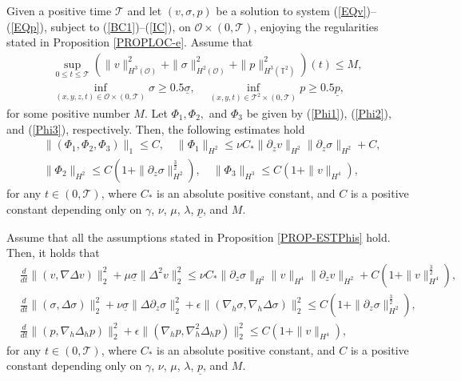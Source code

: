 \documentclass[10pt,a4paper]{amsart}
\begin{document}
\begin{proposition}
\label{PROP-ESTPhis}
Given a positive time $\mathcal T$ and let $(v,\sigma, p)$ be a solution to system (\ref{EQv})--(\ref{EQp}), subject to (\ref{BC1})--(\ref{IC}), on $\mathcal O\times(0,\mathcal T)$, enjoying the regularities
stated in Proposition \ref{PROPLOC-e}. Assume that
\begin{eqnarray}
  \sup_{0\leq t\leq\mathcal T}\left(\|v\|_{H^3(\mathcal O)}^2+\|\sigma\|_{H^2(\mathcal O)}^2+\|p\|_{H^3(\mathbb T^2)}^2\right)(t)\leq M,  \label{ASSUM-APRM}\\
  \inf_{(x,y,z,t)\in\mathcal O\times(0,\mathcal T)}\sigma\geq 0.5\underline\sigma,\quad \inf_{(x,y,t)\in\mathcal T^2\times(0,\mathcal T)}
  p\geq 0.5\underline p,\label{ASSUM-LBsp}
\end{eqnarray}
for some positive number $M$.
Let $\Phi_1, \Phi_2,$ and $\Phi_3$ be given by (\ref{Phi1}),
(\ref{Phi2}), and (\ref{Phi3}), respectively.
Then, the following estimates hold
\begin{align*}
  &\|(\Phi_1, \Phi_2, \Phi_3)\|_1\leq C, \quad \|\Phi_1\|_{H^2}\leq \nu C_*\|\partial_zv\|_{H^2}\|\partial_z\sigma\|_{H^2}+C,
  \\
  &\|\Phi_2\|_{H^2}\leq C\left(1+\|\partial_z\sigma\|_{H^2}^\frac32\right), \quad
  \|\Phi_3\|_{H^3}\leq C(1+\|v\|_{H^4}),
\end{align*}
for any $t\in(0,\mathcal T)$,
where $C_*$ is an absolute positive constant, and $C$ is a positive constant depending only on $\gamma$, $\nu$, $\mu$,
$\lambda$, $\underline p$, and $M$.
\end{proposition}

\begin{proposition}
\label{PROP-EGYINEQT}
Assume that all the assumptions stated in Proposition \ref{PROP-ESTPhis} hold. Then, it holds that
\begin{align*}
  &\frac{d}{dt}\|(v,\nabla\Delta v)\|_2^2+\mu\underline\sigma\|\Delta^2v\|_2^2
  \leq \nu C_*\|\partial_z\sigma\|_{H^2}\|v\|_{H^4}\|\partial_zv\|_{H^2}+C\left(1+\|v\|_{H^4}^\frac32\right),\\
  &\frac{d}{dt}\|(\sigma,\Delta\sigma)\|_2^2+\nu\underline\sigma\|\Delta\partial_z\sigma\|_2^2
  +\epsilon\|(\nabla_h\sigma,\nabla_h\Delta\sigma)\|_2^2
  \leq C\left(1+\|\partial_z\sigma\|_{H^2}^\frac32\right),\\
  &\frac{d}{dt}\|(p,\nabla_h\Delta_hp)\|_2^2+\epsilon\|(\nabla_hp,\nabla_h^2\Delta_hp)\|_2^2\leq C\left(1+\|v\|_{H^4}\right),
\end{align*}
for any $t\in(0,\mathcal T)$,
where $C_*$ is an absolute positive constant, and $C$ is a positive constant depending only on $\gamma$, $\nu$, $\mu$,
$\lambda$, $\underline p$, and $M$.
\end{proposition}
\end{document}
